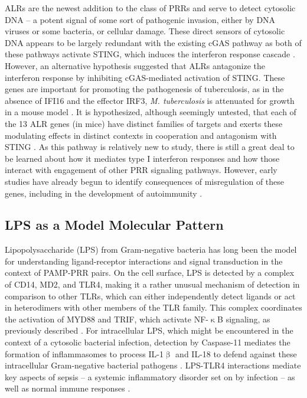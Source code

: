 ALRs are the newest addition to the class of PRRs and serve to detect cytosolic DNA -- a potent signal of some sort of pathogenic invasion, either by DNA viruses or some bacteria, or cellular damage. These direct sensors of cytosolic DNA appears to be largely redundant with the existing cGAS pathway as both of these pathways activate STING, which induces the interferon response cascade \citep{Gray2016}. However, an alternative hypothesis suggested that ALRs antagonize the interferon response by inhibiting cGAS\hyp{}mediated activation of STING. These genes are important for promoting the pathogenesis of tuberculosis, as in the absence of IFI16 and the effector IRF3, \textit{M. tuberculosis} is attenuated for growth in a mouse model \citep{Manzanillo2012}. It is hypothesized, although seemingly untested, that each of the 13 ALR genes (in mice) have distinct families of targets and exerts these modulating effects in distinct contexts in cooperation and antagonism with STING \citep{Nakaya2017}. As this pathway is relatively new to study, there is still a great deal to be learned about how it mediates type I interferon responses and how those interact with engagement of other PRR signaling pathways. However, early studies have already begun to identify consequences of misregulation of these genes, including in the development of autoimmunity \citep{Caneparo2018}.

\subsection{LPS as a Model Molecular Pattern}\label{lps}

Lipopolysaccharide (LPS) from Gram\hyp{}negative bacteria has long been the model for understanding ligand\hyp{}receptor interactions and signal transduction in the context of PAMP\hyp{}PRR pairs. On the cell surface, LPS is detected by a complex of CD14, MD2, and TLR4, making it a rather unusual mechanism of detection in comparison to other TLRs, which can either independently detect ligands or act in heterodimers with other members of the TLR family. This complex coordinates the activation of MYD88 and TRIF, which activate NF\hyp{}$\upkappa$B signaling, as previously described \citep{Miller2005, Beutler2000}. For intracellular LPS, which might be encountered in the context of a cytosolic bacterial infection, detection by Caspase\hyp{}11 mediates the formation of inflammasomes to process IL\hyp{}1$\upbeta$ and IL\hyp{}18 to defend against these intracellular Gram\hyp{}negative bacterial pathogens \citep{Wright1990, Triantafilou2002, Kawai1999, Vasudevan2022, Kayagaki2013, Rathinam2019, Shi2014}. LPS\hyp{}TLR4 interactions mediate key aspects of sepsis -- a systemic inflammatory disorder set on by infection -- as well as normal immune responses \citep{Freudenberg2008}.

